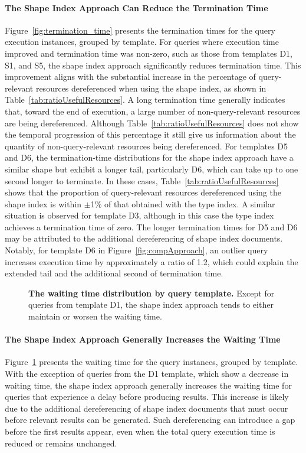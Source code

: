 \paragraph{The Shape Index Approach Can Reduce the Termination Time}
Figure~\ref{fig:termination_time} presents the termination times for the query execution instances, grouped by template. 
For queries where execution time improved and termination time was non-zero, such as those from templates D1, S1, and S5, the shape index approach significantly reduces termination time. 
This improvement aligns with the substantial increase in the percentage of query-relevant resources dereferenced when using the shape index, as shown in Table~\ref{tab:ratioUsefulResources}.
A long termination time generally indicates that, toward the end of execution, a large number of non-query-relevant resources are being dereferenced. 
Although Table~\ref{tab:ratioUsefulResources} does not show the temporal progression of this percentage it still give us information about the quantity of non-query-relevant resources being dereferenced.
For templates D5 and D6, the termination-time distributions for the shape index approach have a similar shape but exhibit a longer tail, particularly D6, which can take up to one second longer to terminate. 
In these cases, Table~\ref{tab:ratioUsefulResources} shows that the proportion of query-relevant resources dereferenced using the shape index is within $\pm$1\% of that obtained with the type index.
A similar situation is observed for template D3, although in this case the type index achieves a termination time of zero. 
The longer termination times for D5 and D6 may be attributed to the additional dereferencing of shape index documents. 
Notably, for template D6 in Figure~\ref{fig:compApproach}, an outlier query increases execution time by approximately a ratio of 1.2, which could explain the extended tail and the additional second of termination time.


\begin{figure}
    \centering
    
    \caption{
    \textbf{The waiting time distribution by query template.}    
    Except for queries from template D1, the shape index approach tends to either maintain or worsen the waiting time.}
    \label{fig:waiting_time}
\end{figure}

\paragraph{The Shape Index Approach Generally Increases the Waiting Time}
Figure~\ref{fig:waiting_time} presents the waiting time for the query instances, grouped by template. 
With the exception of queries from the D1 template, which show a decrease in waiting time, the shape index approach generally increases the waiting time for queries that experience a delay before producing results. 
This increase is likely due to the additional dereferencing of shape index documents that must occur before relevant results can be generated. 
Such dereferencing can introduce a gap before the first results appear, even when the total query execution time is reduced or remains unchanged.



